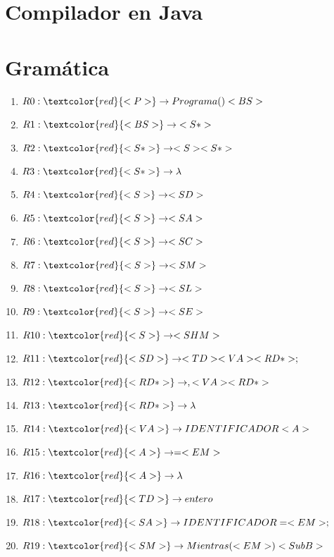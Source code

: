 \documentclass{article}
\begin{document}
\section*{Compilador en Java}

\section{Gramática}

\begin{enumerate}
\item $R0:     \textcolor{red}{<P>}        \rightarrow   Programa()<BS>$
\item $R1:     \textcolor{red}{<BS>}        \rightarrow   {<S*>}$
\item $R2:     \textcolor{red}{<S*>}        \rightarrow   <S><S*>$
\item $R3:     \textcolor{red}{<S*>}        \rightarrow   \lambda$
\item $R4:     \textcolor{red}{<S>}        \rightarrow   <SD>$
\item $R5:     \textcolor{red}{<S>}        \rightarrow   <SA>$
\item $R6:     \textcolor{red}{<S>}        \rightarrow   <SC>$
\item $R7:     \textcolor{red}{<S>}        \rightarrow   <SM>$
\item $R8:     \textcolor{red}{<S>}        \rightarrow   <SL>$
\item $R9:     \textcolor{red}{<S>}        \rightarrow   <SE>$
\item $R10:    \textcolor{red}{<S>}        \rightarrow   <SHM>$
\item $R11:     \textcolor{red}{<SD>}        \rightarrow   <TD><VA><RD*>;$
\item $R12:     \textcolor{red}{<RD*>}        \rightarrow   ,<VA><RD*>$
\item $R13:     \textcolor{red}{<RD*>}        \rightarrow   \lambda $
\item $R14:     \textcolor{red}{<VA>}        \rightarrow   IDENTIFICADOR<A>$
\item $R15:     \textcolor{red}{<A>}        \rightarrow   =<EM>$
\item $R16:     \textcolor{red}{<A>}        \rightarrow   \lambda$
\item $R17:     \textcolor{red}{<TD> }       \rightarrow   entero$
\item $R18:    \textcolor{red}{<SA> }       \rightarrow   IDENTIFICADOR=<EM>;$
\item $R19:    \textcolor{red}{<SM> }       \rightarrow   Mientras(<EM>)<SubB>$

\end{enumerate}
\end{document}
